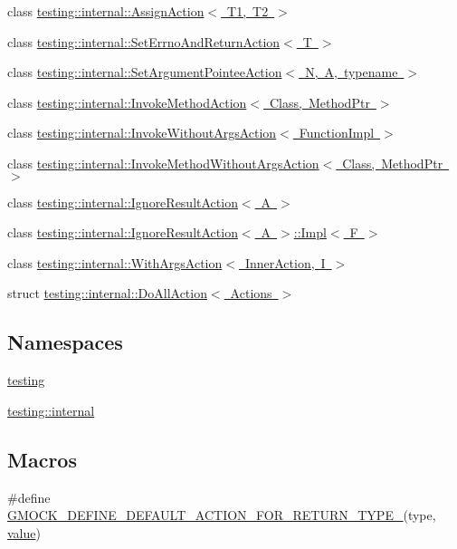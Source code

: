 \begin{DoxyCompactItemize}
\item 
class \mbox{\hyperlink{classtesting_1_1internal_1_1_assign_action}{testing\+::internal\+::\+Assign\+Action$<$ T1, T2 $>$}}
\item 
class \mbox{\hyperlink{classtesting_1_1internal_1_1_set_errno_and_return_action}{testing\+::internal\+::\+Set\+Errno\+And\+Return\+Action$<$ T $>$}}
\item 
class \mbox{\hyperlink{structtesting_1_1internal_1_1_set_argument_pointee_action}{testing\+::internal\+::\+Set\+Argument\+Pointee\+Action$<$ N, A, typename $>$}}
\item 
class \mbox{\hyperlink{structtesting_1_1internal_1_1_invoke_method_action}{testing\+::internal\+::\+Invoke\+Method\+Action$<$ Class, Method\+Ptr $>$}}
\item 
class \mbox{\hyperlink{structtesting_1_1internal_1_1_invoke_without_args_action}{testing\+::internal\+::\+Invoke\+Without\+Args\+Action$<$ Function\+Impl $>$}}
\item 
class \mbox{\hyperlink{structtesting_1_1internal_1_1_invoke_method_without_args_action}{testing\+::internal\+::\+Invoke\+Method\+Without\+Args\+Action$<$ Class, Method\+Ptr $>$}}
\item 
class \mbox{\hyperlink{classtesting_1_1internal_1_1_ignore_result_action}{testing\+::internal\+::\+Ignore\+Result\+Action$<$ A $>$}}
\item 
class \mbox{\hyperlink{classtesting_1_1internal_1_1_ignore_result_action_1_1_impl}{testing\+::internal\+::\+Ignore\+Result\+Action$<$ A $>$\+::\+Impl$<$ F $>$}}
\item 
class \mbox{\hyperlink{structtesting_1_1internal_1_1_with_args_action}{testing\+::internal\+::\+With\+Args\+Action$<$ Inner\+Action, I $>$}}
\item 
struct \mbox{\hyperlink{structtesting_1_1internal_1_1_do_all_action}{testing\+::internal\+::\+Do\+All\+Action$<$ Actions $>$}}
\end{DoxyCompactItemize}
\subsection*{Namespaces}
\begin{DoxyCompactItemize}
\item 
 \mbox{\hyperlink{namespacetesting}{testing}}
\item 
 \mbox{\hyperlink{namespacetesting_1_1internal}{testing\+::internal}}
\end{DoxyCompactItemize}
\subsection*{Macros}
\begin{DoxyCompactItemize}
\item 
\#define \mbox{\hyperlink{googletest-master_2googlemock_2include_2gmock_2gmock-actions_8h_a06b1e6cd1145acf7849e4a112976016b}{G\+M\+O\+C\+K\+\_\+\+D\+E\+F\+I\+N\+E\+\_\+\+D\+E\+F\+A\+U\+L\+T\+\_\+\+A\+C\+T\+I\+O\+N\+\_\+\+F\+O\+R\+\_\+\+R\+E\+T\+U\+R\+N\+\_\+\+T\+Y\+P\+E\+\_\+}}(type,  \mbox{\hyperlink{_obj__test_2lib_2googletest-master_2googlemock_2test_2gmock-matchers__test_8cc_a337b8a670efc0b086ad3af163f3121b6}{value}})
\end{DoxyCompactItemize}
